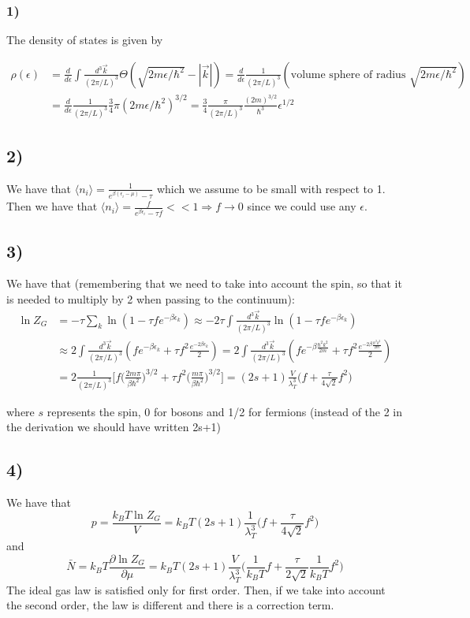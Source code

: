 \documentclass[10pt,a4paper]{book}
\newcommand{\p}{\partial}
\begin{document}
\subsubsection*{1)}
The density of states is given by

\begin{align*}
\rho(\epsilon)&=\frac{d}{d\epsilon}\int \frac{d^3\vec{k}}{(2\pi/L)^3}\Theta(\sqrt{2m\epsilon/\hbar^2}-|\vec{k}|)=\frac{d}{d\epsilon}\frac{1}{(2\pi/L)^3}(\text{volume sphere of radius }\sqrt{2m\epsilon/\hbar^2})\\
&=\frac{d}{d\epsilon}\frac{1}{(2\pi /L)^3}\frac{3}{4}\pi(2m\epsilon/\hbar^2)^{3/2}=\frac{3}{4}\frac{\pi}{(2\pi/L)^3}\frac{(2m)^{3/2}}{\hbar^3}\epsilon^{1/2}
\end{align*}


\subsection*{2)}
We have that $\langle n_i\rangle =\frac{1}{e^{\beta(\epsilon_i-\mu)}-\tau}$ which we assume to be small with respect to 1. Then we have that $\langle n_i\rangle =\frac{f}{e^{\beta\epsilon_i}-\tau f}<<1\Rightarrow f\to 0$ since we could use any $\epsilon$. 

\subsection*{3)}
We have that (remembering that we need to take into account the spin, so that it is needed to multiply by 2 when passing to the continuum):
\begin{align*}
\ln Z_G&=-\tau\sum_k\ln(1-\tau f e^{-\beta\epsilon_k})\approx -2\tau\int \frac{d^3\vec{k}}{(2\pi/L)^3}\ln(1-\tau fe^{-\beta\epsilon_k})\\
&\approx 2\int\frac{d^3\vec{k}}{(2\pi/L)^3}(fe^{-\beta\epsilon_k}+\tau f^2\frac{e^{-2\beta\epsilon_k}}{2})=2\int\frac{d^3\vec{k}}{(2\pi/L)^3}(fe^{-\beta\frac{\hbar^2 k^2}{2m}}+\tau f^2\frac{e^{-2\beta\frac{\hbar^2 k^2}{2m}}}{2})\\
&=2\frac{1}{(2\pi/L)^3}\bigg[f\bigg(\frac{2m\pi}{\beta\hbar^2}\bigg)^{3/2}+\tau f^2\bigg(\frac{m\pi}{\beta\hbar^2}\bigg)^{3/2}\bigg]=(2s+1)\frac{V}{\lambda_T^3}\bigg(f+\frac{\tau}{4\sqrt{2}}f^2\bigg)
\end{align*}

where $s$ represents the spin, 0 for bosons and 1/2 for fermions (instead of the 2 in the derivation we should have written 2s+1)

\subsection*{4)}
We have that 
$$p=\frac{k_BT\ln Z_G}{V}=k_BT(2s+1)\frac{1}{\lambda_T^3}\bigg(f+\frac{\tau}{4\sqrt{2}}f^2\bigg)$$
and 
$$\bar{N}=k_BT\frac{\p\ln Z_G}{\p\mu}=k_BT(2s+1)\frac{V}{\lambda_T^3}\bigg(\frac{1}{k_BT}f+\frac{\tau}{2\sqrt{2}}\frac{1}{k_BT}f^2\bigg)$$
The ideal gas law is satisfied only for first order. Then, if we take into account the second order, the law is different and there is a correction term.
\end{document}
